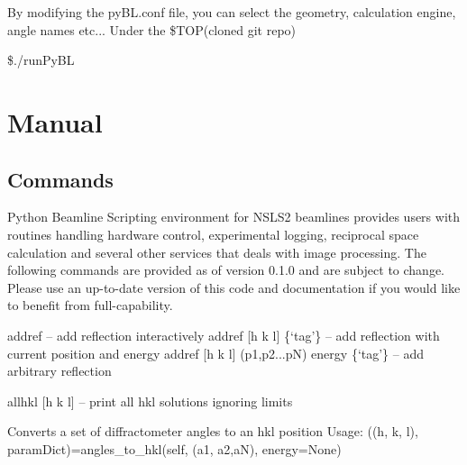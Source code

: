 \documentclass[letterpaper,10pt,english]{sphinxmanual}
\begin{document}
By modifying the pyBL.conf file, you can select the geometry, calculation engine, angle names etc...
Under the \$TOP(cloned git repo)

\$./runPyBL


\chapter{Manual}
\label{Manual:module-commands}\label{Manual:manual}\label{Manual::doc}

\section{Commands}
\label{Manual:commands}
Python Beamline Scripting environment for NSLS2 beamlines provides users with routines handling hardware control, experimental logging, reciprocal space calculation and several other services that deals with image processing. The following commands are provided as of version 0.1.0 and are subject to change. Please use an up-to-date version of this code and documentation if you would like to benefit from full-capability.

\begin{fulllineitems}
\label{Manual:commands.addref}
addref -- add reflection interactively
addref {[}h k l{]} \{`tag'\} -- add reflection with current position and energy
addref {[}h k l{]} (p1,p2...pN) energy \{`tag'\} -- add arbitrary reflection

\end{fulllineitems}


\begin{fulllineitems}
\label{Manual:commands.allhkl}
allhkl {[}h k l{]} -- print all hkl solutions ignoring limits

\end{fulllineitems}


\begin{fulllineitems}
\label{Manual:commands.angles_to_hkl}
Converts a set of diffractometer angles to an hkl position
Usage:
((h, k, l), paramDict)=angles\_to\_hkl(self, (a1, a2,aN), energy=None)

\end{fulllineitems}
\end{document}
